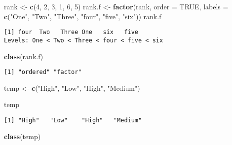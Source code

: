 \documentclass[]{book}
\newenvironment{Shaded}{\begin{snugshade}}{\end{snugshade}}
\newcommand{\KeywordTok}[1]{\textcolor[rgb]{0.13,0.29,0.53}{\textbf{#1}}}
\newcommand{\DataTypeTok}[1]{\textcolor[rgb]{0.13,0.29,0.53}{#1}}
\newcommand{\DecValTok}[1]{\textcolor[rgb]{0.00,0.00,0.81}{#1}}
\newcommand{\StringTok}[1]{\textcolor[rgb]{0.31,0.60,0.02}{#1}}
\newcommand{\OtherTok}[1]{\textcolor[rgb]{0.56,0.35,0.01}{#1}}
\newcommand{\NormalTok}[1]{#1}
\theoremstyle{definition}
\theoremstyle{definition}
\theoremstyle{definition}
\theoremstyle{remark}
\begin{document}
\begin{Shaded}
\begin{Highlighting}[]
\NormalTok{rank <-}\StringTok{ }\KeywordTok{c}\NormalTok{(}\DecValTok{4}\NormalTok{, }\DecValTok{2}\NormalTok{, }\DecValTok{3}\NormalTok{, }\DecValTok{1}\NormalTok{, }\DecValTok{6}\NormalTok{, }\DecValTok{5}\NormalTok{)}
\NormalTok{rank.f <-}\StringTok{ }\KeywordTok{factor}\NormalTok{(rank, }
                 \DataTypeTok{order =} \OtherTok{TRUE}\NormalTok{, }
                 \DataTypeTok{labels =} \KeywordTok{c}\NormalTok{(}\StringTok{"One"}\NormalTok{, }\StringTok{"Two"}\NormalTok{,}
                            \StringTok{"Three"}\NormalTok{, }\StringTok{"four"}\NormalTok{, }
                            \StringTok{"five"}\NormalTok{, }\StringTok{"six"}\NormalTok{))}
\NormalTok{rank.f}
\end{Highlighting}
\end{Shaded}

\begin{verbatim}
[1] four  Two   Three One   six   five 
Levels: One < Two < Three < four < five < six
\end{verbatim}

\begin{Shaded}
\begin{Highlighting}[]
\KeywordTok{class}\NormalTok{(rank.f)}
\end{Highlighting}
\end{Shaded}

\begin{verbatim}
[1] "ordered" "factor" 
\end{verbatim}

\begin{Shaded}
\begin{Highlighting}[]
\NormalTok{temp <-}\StringTok{ }\KeywordTok{c}\NormalTok{(}\StringTok{"High"}\NormalTok{, }\StringTok{"Low"}\NormalTok{, }\StringTok{"High"}\NormalTok{, }\StringTok{"Medium"}\NormalTok{)}

\NormalTok{temp}
\end{Highlighting}
\end{Shaded}

\begin{verbatim}
[1] "High"   "Low"    "High"   "Medium"
\end{verbatim}

\begin{Shaded}
\begin{Highlighting}[]
\KeywordTok{class}\NormalTok{(temp)}
\end{Highlighting}
\end{Shaded}
\end{document}
